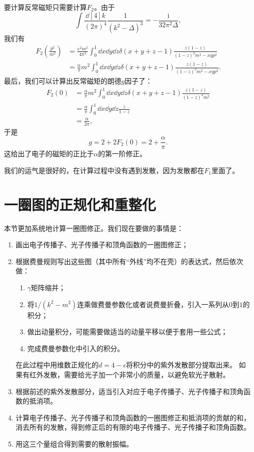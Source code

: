 \documentclass[hyperref, UTF8, a4paper]{ctexart}
\newcommand*{\ii}{\mathrm{i}}
\begin{document}
要计算反常磁矩只需要计算$F_2$。由于
\[
    \int \frac{\dd[4]{k}}{(2\pi)^4} \frac{1}{(k^2 - \Delta)^3} = - \frac{\ii}{32 \pi^2 \Delta},
\]
我们有
\[
    \begin{aligned}
        F_2\left(\frac{p^2}{m^2}\right) &= \frac{e^2 m^2}{4\pi^2} \int_0^1 \dd{x} \dd{y} \dd{z} \delta(x + y + z - 1) \frac{z(1-z)}{(1-z)^2 m^2 - xy p^2} \\
        &= \frac{\alpha}{\pi} m^2 \int_0^1 \dd{x} \dd{y} \dd{z} \delta(x + y + z - 1) \frac{z(1-z)}{(1-z)^2 m^2 - xy p^2}.
    \end{aligned}
\]
最后，我们可以计算出反常磁矩的朗德$g$因子了：
\[
    \begin{aligned}
        F_2(0) &= \frac{\alpha}{\pi} m^2 \int_0^1 \dd{x} \dd{y} \dd{z} \delta(x + y + z - 1) \frac{z(1-z)}{(1-z)^2 m^2} \\
        &= \frac{\alpha}{\pi} \int_0^1 \dd{x} \dd{y} \dd{z} \frac{z}{1-z} \\
        &= \frac{\alpha}{2\pi},
    \end{aligned}
\]
于是
\begin{equation}
    g = 2 + 2 F_2(0) = 2 + \frac{\alpha}{\pi}.
\end{equation}
这给出了电子的磁矩的正比于$\alpha$的第一阶修正。

我们的运气是很好的，在计算过程中没有遇到发散，因为发散都在$F_1$里面了。

\section{一圈图的正规化和重整化}

本节更加系统地计算一圈图修正。我们现在要做的事情是：
\begin{enumerate}
    \item 画出电子传播子、光子传播子和顶角函数的一圈图修正；
    \item 根据费曼规则写出这些图（其中所有“外线”均不在壳）的表达式，然后依次做：
    \begin{enumerate}
        \item $\gamma$矩阵缩并；
        \item 将$1/(k^2 - m^2)$连乘做费曼参数化或者说费曼折叠，引入一系列从$0$到$1$的积分；
        \item 做出动量积分，可能需要做适当的动量平移以便于套用一些公式；
        \item 完成费曼参数化中引入的积分。
    \end{enumerate}
    在此过程中用维数正规化的$d = 4 - \epsilon$将积分中的紫外发散部分提取出来。
    如果有红外发散，需要给光子加一个非常小的质量，以避免软光子散射。
    \item 根据前述的紫外发散部分，适当引入对应于电子传播子、光子传播子和顶角函数的抵消项。
    \item 计算电子传播子、光子传播子和顶角函数的一圈图修正和抵消项的贡献的和，消去所有的发散，得到修正后的有限的电子传播子、光子传播子和顶角函数。
    \item 用这三个量组合得到需要的散射振幅。
\end{enumerate}
\end{document}
